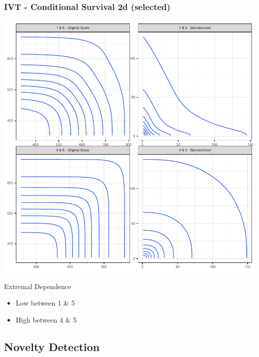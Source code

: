 \documentclass[aspectratio=169,10pt]{beamer}
\newlength{\frametextheight}
\begin{document}
\begin{frame}
    \frametitle{IVT - Conditional Survival 2d (selected)}
    \begin{minipage}{.49\textwidth}
        \centering
        \includegraphics[height=\frametextheight]{./ch1/images/condsurv_2d}
    \end{minipage}
    \begin{minipage}{.49\textwidth}
    Extremal Dependence
        \begin{itemize}
            \item Low between 1 \& 5
            \item High between 4 \& 5
        \end{itemize}
    \end{minipage}
\end{frame} %


\subsection*{Novelty Detection}
\end{document}

